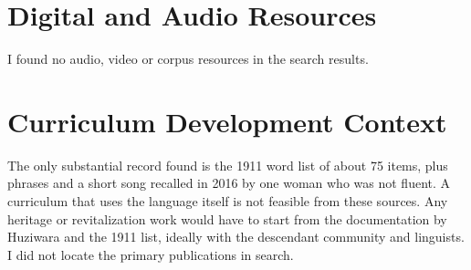 \documentclass[12pt]{article}
\begin{document}
\section{Digital and Audio Resources}
I found no audio, video or corpus resources in the search results.
\section{Curriculum Development Context}
The only substantial record found is the 1911 word list of about 75 items, plus phrases and a short song recalled in 2016 by one woman who was not fluent. A curriculum that uses the language itself is not feasible from these sources. Any heritage or revitalization work would have to start from the documentation by Huziwara and the 1911 list, ideally with the descendant community and linguists. I did not locate the primary publications in search.
\end{document}
